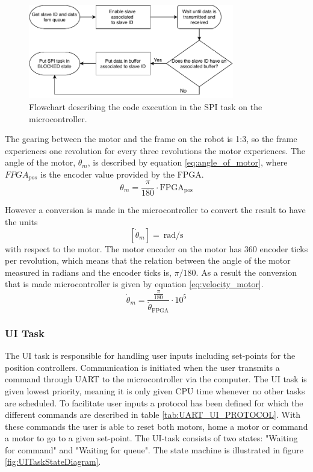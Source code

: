 \documentclass[../../main.tex]{subfiles}
\begin{document}
\begin{figure}[H]
    \centering
    \includegraphics[width=0.8\textwidth]{Sections/System_Implementation/Images/SPIFlowchart.pdf}
    \caption{Flowchart describing the code execution in the SPI task on the microcontroller.}
    \label{fig:SPIFlowchart}
\end{figure}


The gearing between the motor and the frame on the robot is 1:3, so the frame experiences one revolution for every three revolutions the motor experiences. The angle of the motor, $ \theta_{m} $, is described by equation \ref{eq:angle_of_motor}, where $FPGA_{pos}$ is the encoder value provided by the FPGA.
\begin{equation}\label{eq:angle_of_motor}
     \theta_{m} = \frac{\pi}{180} \cdot \mathrm{FPGA_{pos}}
\end{equation}


However a conversion is made in the microcontroller to convert the result to have the units \[ \left[ \dot{\theta}_m \right] = \SI{}{\radian \per \second } \] with respect to the motor. The motor encoder on the motor has 360 encoder ticks per revolution, which means that the relation between the angle of the motor measured in radians and the encoder ticks is, $\pi / 180$. As a result the conversion that is made microcontroller is given by equation \ref{eq:velocity_motor}.
\begin{equation}\label{eq:velocity_motor}
    \dot{\theta}_{m} = \frac{\frac{\pi}{180}}{ \dot{\theta}_{\mathrm{FPGA}} }\cdot 10^{5}
\end{equation}





\subsubsection*{UI Task}
The UI task is responsible for handling user inputs including set-points for the position controllers. Communication is initiated when the user transmits a command through UART to the microcontroller via the computer. The UI task is given lowest priority, meaning it is only given CPU time whenever no other tasks are scheduled. To facilitate user inputs a protocol has been defined for which the different commands are described in table \ref{tab:UART_UI_PROTOCOL}. With these commands the user is able to reset both motors, home a motor or command a motor to go to a given set-point. The UI-task consists of two states: "Waiting for command" and "Waiting for queue". The state machine is illustrated in figure
\ref{fig:UITaskStateDiagram}. 
\end{document}
